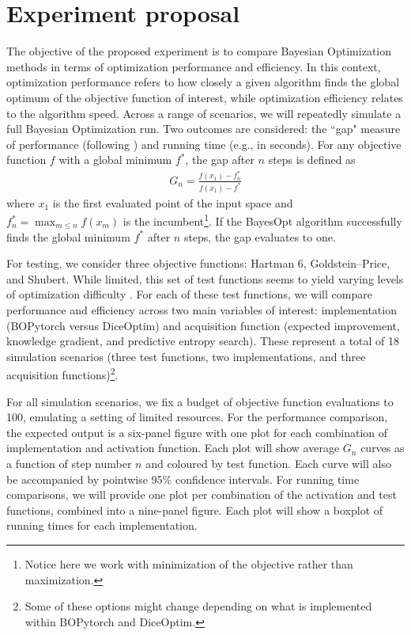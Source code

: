 

\section{Experiment proposal}

The objective of the proposed experiment is to compare Bayesian Optimization methods in terms of optimization performance and efficiency. In this context, optimization performance refers to how closely a given algorithm finds the global optimum of the objective function of interest, while optimization efficiency relates to the algorithm speed. Across a range of scenarios, we will repeatedly simulate a full Bayesian Optimization run. Two outcomes are considered: the ``gap" measure of performance (following \cite{Huang2006}) and running time (e.g., in seconds). For any objective function $f$ with a global minimum $f^*$, the gap after $n$ steps is defined as
\begin{align}
    G_n = \frac{f(x_1) - f_n^*}{f(x_1)-f^*}\label{gap}
\end{align}
where $x_1$ is the first evaluated point of the input space and $f_n^*=\max_{m\leq n}f(x_m)$ is the incumbent\footnote{Notice here we work with minimization of the objective rather than maximization.}. If the BayesOpt algorithm successfully finds the global minimum $f^*$ after $n$ steps, the gap evaluates to one.

For testing, we consider three objective functions: Hartman 6, Goldstein–Price, and Shubert. While limited, this set of test functions seems to yield varying levels of optimization difficulty \cite{Osborne2009}. For each of these test functions, we will compare performance and efficiency across two main variables of interest:
implementation (BOPytorch versus DiceOptim) and acquisition function (expected improvement, knowledge gradient, and predictive entropy search). These represent a total of 18 simulation scenarios (three test functions, two implementations, and three acquisition functions)\footnote{Some of these options might change depending on what is implemented within BOPytorch and DiceOptim.}.

For all simulation scenarios, we fix a budget of objective function evaluations to 100, emulating a setting of limited resources. For the performance comparison, the expected output is a six-panel figure with one plot for each combination of implementation and activation function. Each plot will show average $G_n$ curves as a function of step number $n$ and coloured by test function. Each curve will also be accompanied by pointwise 95\% confidence intervals. For running time comparisons, we will provide one plot per combination of the activation and test functions, combined into a nine-panel figure. Each plot will show a boxplot of running times for each implementation.

